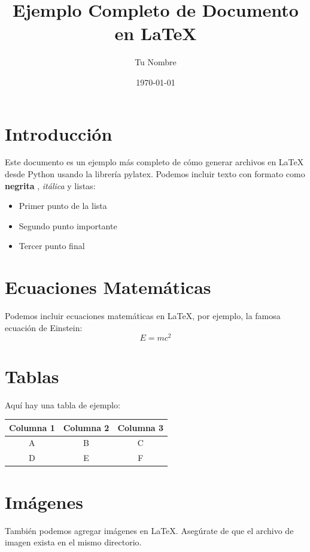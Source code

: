 \documentclass{article}%
\title{Ejemplo Completo de Documento en LaTeX}%
\author{Tu Nombre}%
\date{\today}%
\begin{document}
%
\normalsize%
\maketitle%
\section{Introducción}%
\label{sec:Introduccin}%
Este documento es un ejemplo más completo de cómo generar archivos en LaTeX desde Python usando la librería pylatex.\newline%
%
Podemos incluir texto con formato como %
\textbf{negrita}%
, %
\textit{itálica}%
 y listas:\newline%
%
\begin{itemize}%
\item Primer punto de la lista%
\item Segundo punto importante%
\item Tercer punto final%
\end{itemize}

%
\section{Ecuaciones Matemáticas}%
\label{sec:EcuacionesMatemticas}%
Podemos incluir ecuaciones matemáticas en LaTeX, por ejemplo, la famosa ecuación de Einstein:%
\begin{equation} E = mc^2 \end{equation}

%
\section{Tablas}%
\label{sec:Tablas}%
Aquí hay una tabla de ejemplo:\newline%
%
\begin{tabular}{c c c}%
\hline%
Columna 1&Columna 2&Columna 3\\%
\hline%
A&B&C\\%
D&E&F\\%
\hline%
\end{tabular}

%
\section{Imágenes}%
\label{sec:Imgenes}%
También podemos agregar imágenes en LaTeX. Asegúrate de que el archivo de imagen exista en el mismo directorio.\newline%
%
\end{document}
